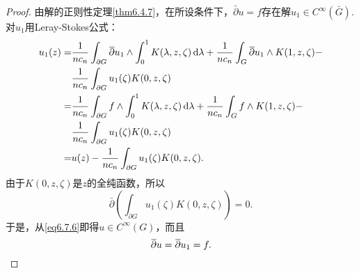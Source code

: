 \begin{proof}
	由解的正则性定理\ref{thm6.4.7}，在所设条件下，$\bar{\partial}u=f$存在解$u_1\in C^\infty(\bar{G})$.对$u_1$用Leray-Stokes公式：
	\begin{align}\label{eq6.7.6}
		u_1(z)
		=&\frac1{nc_n}\int_{\partial G}\bar{\partial}u_1 \wedge\int_{0}^{1}K(\lambda,z,\zeta)\dif\lambda+
		\frac1{nc_n}\int_G\bar{\partial}u_1 \wedge K(1,z,\zeta)-\notag\\
		&\frac1{nc_n}\int_{\partial G}u_1(\zeta)K(0,z,\zeta)\notag\\
		=&\frac1{nc_n}\int_{\partial G}f \wedge\int_{0}^{1}K(\lambda,z,\zeta)\dif\lambda+
		\frac1{nc_n}\int_G f\wedge K(1,z,\zeta)-\notag\\
		&\frac1{nc_n}\int_{\partial G}u_1(\zeta)K(0,z,\zeta)\notag\\
		=&u(z)-\frac1{nc_n}\int_{\partial G}u_1(\zeta)K(0,z,\zeta).
	\end{align}
	由于$K(0,z,\zeta)$是$z$的全纯函数，所以
	\[\bar{\partial}\left(\int_{\partial G}u_1(\zeta)K(0,z,\zeta)\right)=0.\]
	于是，从\eqref{eq6.7.6}即得$u\in C^\infty(G)$，而且
	\[\bar{\partial}u=\bar{\partial}u_1=f.\qedhere\]
\end{proof}

